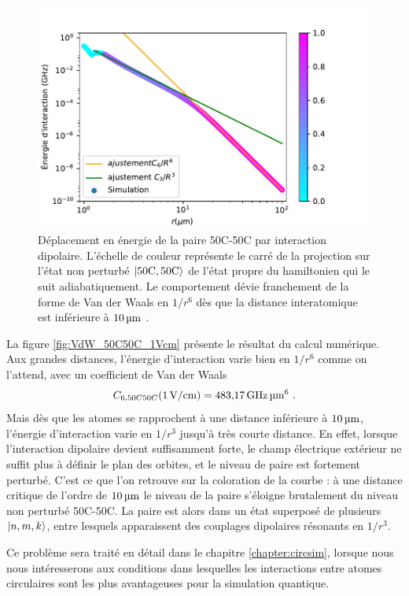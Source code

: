 \begin{figure}[!h]
\centering
\includegraphics[width=1\linewidth]{figures/VdW_50C50C_1Vcm}
\caption[Interaction dipolaire 50C-50C]{Déplacement en énergie de la paire 50C-50C par interaction dipolaire. L'échelle de couleur représente le carré de la projection sur l'état non perturbé $\ket{50\text{C},50\text{C}}$ de l'état propre du hamiltonien qui le suit adiabatiquement.
Le comportement dévie franchement de la forme de Van der Waals en $1/r^6$ dès que la distance interatomique est inférieure à $\SIv{10}{\micro\meter}$.}
\label{fig:VdW_50C50C_1Vcm}
\end{figure}

La figure \eqref{fig:VdW_50C50C_1Vcm} présente le résultat du calcul numérique.
Aux grandes distances, l'énergie d'interaction varie bien en $1/r^6$ comme on l'attend, avec un coefficient de Van der Waals 
\begin{equation}
\label{eq:C6_50C50C}
C_{6,50C50C}(\SIvv{1}{V/cm}) = \SIv{483.17}{\GHz\raiseto{6}\um}.
\end{equation}
Mais dès que les atomes se rapprochent à une distance inférieure à $\SIvv{10}{\um}$, l'énergie d'interaction varie en $1/r^3$ jusqu'à très courte distance.
En effet, lorsque l'interaction dipolaire devient suffisamment forte, le champ électrique extérieur ne suffit plus à définir le plan des orbites, et le niveau de paire est fortement perturbé.
C'est ce que l'on retrouve sur la coloration de la courbe : à une distance critique de l'ordre de $\SIvv{10}{\um}$ le niveau de la paire s'éloigne brutalement du niveau non perturbé 50C-50C.
La paire est alors dans un état superposé de plusieurs $\ket{n,m,k}$, entre lesquels apparaissent des couplages dipolaires résonants en $1/r^3$.

Ce problème sera traité en détail dans le chapitre \ref{chapter:circsim}, lorsque nous nous intéresserons aux conditions dans lesquelles les interactions entre atomes circulaires sont les plus avantageuses pour la simulation quantique.

